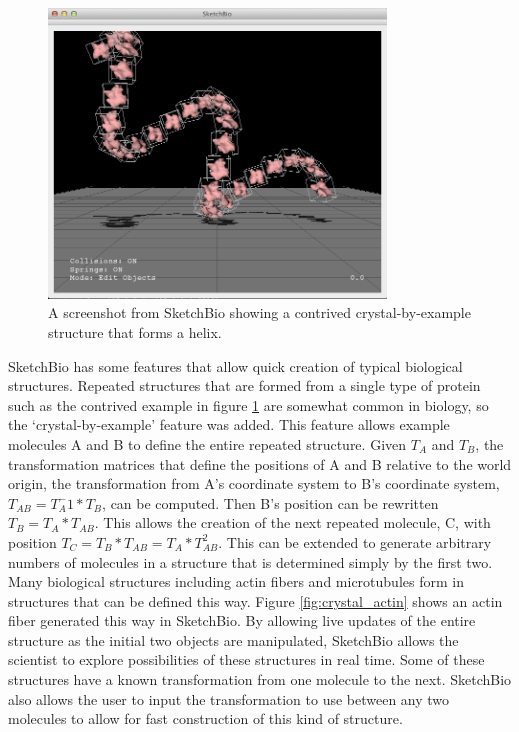 \documentclass{article} %
\begin{document}
\begin{figure}[h]
\centering
\includegraphics[width=0.8\textwidth]{crystalByExample.png}
\caption{A screenshot from SketchBio showing a contrived crystal-by-example structure that forms a helix.}
\label{fig:crystal_by_example}
\end{figure}
SketchBio has some features that allow quick creation of typical biological structures.  Repeated structures that are formed from a single type of protein such as the contrived example in figure \ref{fig:crystal_by_example} are somewhat common in biology, so the ‘crystal-by-example' feature was added.  This feature allows example molecules A and B to define the entire repeated structure.  Given $T_A$ and $T_B$, the transformation matrices that define the positions of A and B relative to the world origin, the transformation from A's coordinate system to B's coordinate system, $T_{AB} = T_A^-1*T_B$, can be computed.  Then B's position can be rewritten $T_B = T_A*T_{AB}$.  This allows the creation of the next repeated molecule, C, with position $T_C = T_B*T_{AB} = T_A*T_{AB}^2$.  This can be extended to generate arbitrary numbers of molecules in a structure that is determined simply by the first two.  Many biological structures including actin fibers and microtubules form in structures that can be defined this way.  Figure \ref{fig:crystal_actin} shows an actin fiber generated this way in SketchBio.  By allowing live updates of the entire structure as the initial two objects are manipulated, SketchBio allows the scientist to explore possibilities of these structures in real time.  Some of these structures have a known transformation from one molecule to the next.  SketchBio also allows the user to input the transformation to use between any two molecules to allow for fast construction of this kind of structure.
\end{document}
